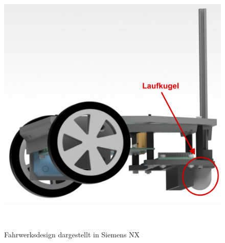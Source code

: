 \documentclass[main.tex]{subfiles} %
\begin{document}
\begin{figure}[H]
    \centering
    \includegraphics[width = 0.8\linewidth]{./fig_Mechanik/Fahrwerkskonzept_CAD.pdf}
    \caption{Fahrwerksdesign dargestellt in Siemens NX}~\label{Fahrwerkskonzept-CAD}
\end{figure}
\end{document}
